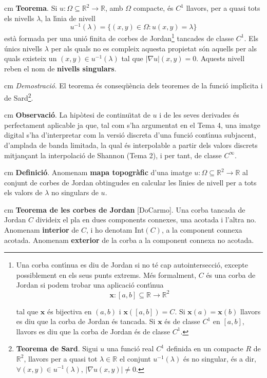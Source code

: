 \documentclass{article}
\def\R{\mathbb R}
\begin{document}
 cm
\noindent
{\bf Teorema}. Si $u:\Omega \subseteq \R^2 \longrightarrow \R$, amb $\Omega$ compacte,
 \'es $C^1$ llavors, per a quasi tots els nivells $\lambda$, la l\'\i nia de
nivell 
\[
u^{-1}(\lambda)=\{ (x, y) \in \Omega : u(x, y)=\lambda \}
\]
\noindent
est\`a formada per una uni\'o finita de corbes de Jordan\footnote{Una corba cont\'\i nua es 
diu de Jordan si no t\'e cap autointersecci\'o, excepte possiblement en els seus punts extrems. M\'es 
formalment, $C$ \'es una corba de Jordan si podem trobar una aplicaci\'o cont\'\i nua 
\[
\boldsymbol{x}: [a, b] \subseteq \R \longrightarrow \R^2
\]

\noindent
tal que $\boldsymbol{x}$ \'es bijectiva en $(a, b)$ i $\boldsymbol{x}([a, b])=C$. 
Si $\boldsymbol{x}(a)=\boldsymbol{x}(b)$
llavors es diu que la corba de Jordan \'es tancada. Si $\boldsymbol{x}$ \'es de classe $C^1$ en $[a, b]$, 
llavors es diu que la corba de Jordan \'es de classe $C^1$.} tancades de classe $C^1$.
Els \'unics nivells $\lambda$ per als quals no es compleix aquesta propietat s\'on aquells per als quals 
existeix un $(x, y) \in u^{-1}(\lambda)$ tal que $|\nabla u|(x, y) = 0$. Aquests nivell reben el nom de 
{\bf nivells singulars}.

 cm
\noindent
{\it Demostraci\'o}. El teorema \'es conseq\"u\`encia dels teoremes de la funci\'o impl\'\i cita i de 
Sard\footnote{{\bf Teorema de Sard}\cite{??}. Sigui $u$ una funci\'o real $C^1$ definida en un compacte $R$
de $\R^2$, llavors per a quasi tot $\lambda \in \R$ el conjunt $u^{-1}(\lambda)$ \'es no singular,
\'es a dir, $\forall (x, y) \in u^{-1}(\lambda)$, $|\nabla u (x, y)| \neq 0$.}.


 cm
\noindent
{\bf Observaci\'o}. La hip\`otesi de continu\"\i tat de $u$ i de les seves derivades \'es perfectament aplicable
ja que, tal com s'ha argumentat en el Tema 4, una imatge digital s'ha d'interpretar com la versi\'o
discreta d'una funci\'o cont\'\i nua subjacent, d'amplada de banda limitada, la qual \'es interpolable a partir 
dels valors discrets mitjan\c{c}ant la interpolaci\'o de Shannon (Tema 2), i per tant, de classe $C^\infty$.

 cm
\noindent
{\bf Definici\'o}. Anomenam {\bf mapa topogr\`afic} d'una imatge $u:\Omega \subseteq \R^2 \longrightarrow \R$
al conjunt de corbes de Jordan obtingudes en calcular les l\'\i nies de nivell per a tots
els valors de $\lambda$ no singulars de $u$.


 cm
\noindent
{\bf Teorema de les corbes de Jordan} [DoCarmo]. Una corba tancada de Jordan $C$ divideix el pla en dues
components connexes, una acotada i l'altra no. Anomenam {\bf interior} de $C$, i ho denotam $\text{Int}(C)$,
a la component connexa acotada. Anomenam {\bf exterior} de la corba a la component connexa no acotada.
\end{document}
